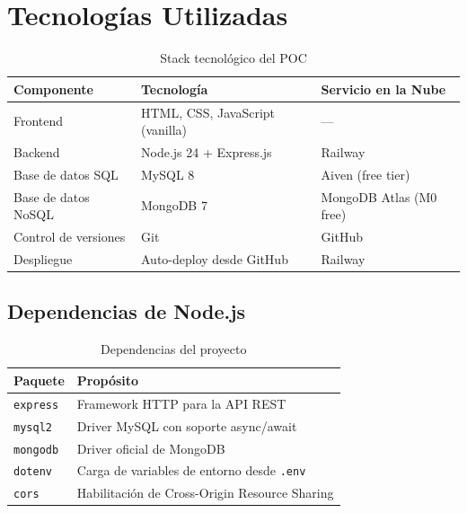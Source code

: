 \documentclass[12pt, a4paper]{article}
\begin{document}
\section{Tecnologías Utilizadas}
\begin{table}[H]
\centering
\begin{tabular}{@{}lll@{}}
\toprule
\textbf{Componente} & \textbf{Tecnología} & \textbf{Servicio en la Nube} \\
\midrule
Frontend        & HTML, CSS, JavaScript (vanilla) & --- \\
Backend         & Node.js 24 + Express.js         & Railway \\
Base de datos SQL   & MySQL 8                     & Aiven (free tier) \\
Base de datos NoSQL & MongoDB 7                   & MongoDB Atlas (M0 free) \\
Control de versiones & Git                        & GitHub \\
Despliegue      & Auto-deploy desde GitHub        & Railway \\
\bottomrule
\end{tabular}
\caption{Stack tecnológico del POC}
\end{table}
\subsection{Dependencias de Node.js}
\begin{table}[H]
\centering
\begin{tabular}{@{}ll@{}}
\toprule
\textbf{Paquete} & \textbf{Propósito} \\
\midrule
\texttt{express}   & Framework HTTP para la API REST \\
\texttt{mysql2}    & Driver MySQL con soporte async/await \\
\texttt{mongodb}   & Driver oficial de MongoDB \\
\texttt{dotenv}    & Carga de variables de entorno desde \texttt{.env} \\
\texttt{cors}      & Habilitación de Cross-Origin Resource Sharing \\
\bottomrule
\end{tabular}
\caption{Dependencias del proyecto}
\end{table}
\end{document}
